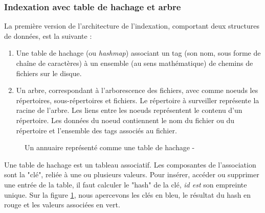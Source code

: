 \subsubsection{Indexation avec table de hachage et arbre}\label{indexation_hashmap_arbre}
La première version de l'architecture de l'indexation, comportant deux structures de données, est la suivante :
\begin{enumerate}
    \item Une table de hachage (ou \textit{hashmap}) associant un tag (son nom, sous forme de 
        chaîne de caractères) à un ensemble (au sens mathématique) de chemins de fichiers sur 
        le disque.
    \item Un arbre, correspondant à l'arborescence des fichiers, avec comme noeuds les répertoires, 
        sous-répertoires et fichiers. Le répertoire à surveiller représente la racine de l'arbre.
        Les liens entre les noeuds représentent le contenu d'un répertoire. Les données du noeud 
        contiennent le nom du fichier ou du répertoire et l'ensemble des tags associés au fichier.
\end{enumerate}
\begin{figure}
    \begin{center}
    \end{center}
    \caption{Un annuaire représenté comme une table de hachage - \cite{ref27}}
    \label{hashmap_wiki}
\end{figure}
Une table de hachage est un tableau associatif. Les composantes de l'association sont la "clé", 
reliée à une ou plusieurs valeurs. Pour insérer, accéder ou supprimer une entrée de la table, 
il faut calculer le "hash" de la clé, \textit{id est} son empreinte unique. Sur la figure \ref{hashmap_wiki}, 
nous apercevons les clés en bleu, le résultat du hash en rouge et les valeurs associées en vert. 
